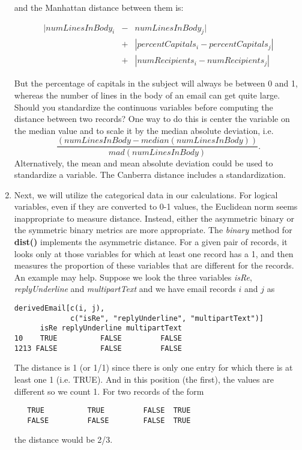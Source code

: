 \documentclass{article}
\def\SFunc#1{\textbf{#1()}}
\def\Svar#1{\textsl{#1}}
\begin{document}
\begin{enumerate}
and the Manhattan distance between them is:
 
\begin{eqnarray*}
  |numLinesInBody_i &-& numLinesInBody_j|\\
    &+& |percentCapitals_i - percentCapitals_j|\\
      &+& |numRecipients_i - numRecipients_j|
\end{eqnarray*}

But the percentage of capitals in the subject
will always be between 0 and 1,
whereas the number of lines in the body of an
email can get quite large.
Should you standardize the continuous variables before
computing the distance between two records?
One way to do this is center the variable on
the median value and to scale it by the median
absolute deviation, i.e.
$$
\frac{(numLinesInBody - median(numLinesInBody))}
{mad(numLinesInBody)} .$$
Alternatively, the mean and mean absolute deviation could
be used to standardize a variable.
The Canberra distance includes a standardization.
 



\item Next, we will utilize the categorical data in our calculations.
  For logical variables, even if they are converted to 0-1 values, the
  Euclidean norm seems inappropriate to measure distance.  Instead,
  either the asymmetric binary or the symmetric binary metrics are
  more appropriate.  The \textit{binary} method for \SFunc{dist}
  implements the asymmetric distance.  For a given pair of records, it
  looks only at those variables for which at least one record has a 1,
  and then measures the proportion of these variables that are
  different for the records.  
An example may help. Suppose we look the three variables
\Svar{isRe}, \Svar{replyUnderline} and \Svar{multipartText}
and we have email records $i$ and $j$ as
\begin{verbatim}
derivedEmail[c(i, j), 
             c("isRe", "replyUnderline", "multipartText")]
      isRe replyUnderline multipartText
10    TRUE          FALSE         FALSE
1213 FALSE          FALSE         FALSE
\end{verbatim}
The distance is 1 (or 1/1) since there is only one
entry for which there is at least one 1 (i.e. TRUE).
And in this position (the first), the values are different so we count 1.
For two records of the form
\begin{verbatim}
   TRUE          TRUE         FALSE  TRUE
   FALSE         FALSE        FALSE  TRUE
\end{verbatim}
the distance would be 2/3.


\end{enumerate}
\end{document}
